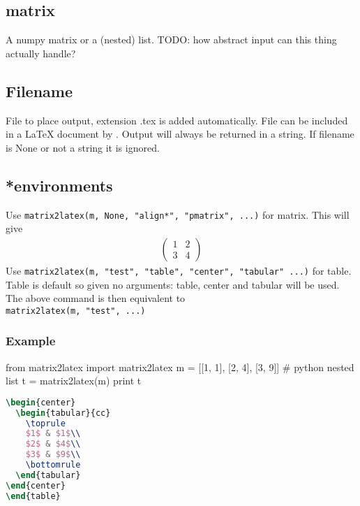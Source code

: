 \subsection{matrix}
  A numpy matrix or a (nested) list. TODO: how abstract input can this thing actually handle?

\subsection{Filename}
  File to place output, extension .tex is added automatically. File can be included in a LaTeX
  document by \verb!!. Output will always be returned in a string. If filename is None
  or not a string it is ignored.
  
\subsection{*environments}
  Use 
\lstinline{matrix2latex(m, None, "align*", "pmatrix", ...)} for matrix.
  This will give
  \begin{align*}
    \begin{pmatrix}
      1 & 2 \\
      3 & 4
    \end{pmatrix}
  \end{align*}
  Use 
\lstinline{matrix2latex(m, "test", "table", "center", "tabular" ...)} for table.
  Table is default so given no arguments: table, center and tabular will be used.
  The above command is then equivalent to \\
\lstinline{matrix2latex(m, "test", ...)}

\subsubsection{Example}
\begin{sageblock}
  from matrix2latex import matrix2latex
  m = [[1, 1], [2, 4], [3, 9]] # python nested list
  t = matrix2latex(m)
  print t
\end{sageblock}
\begin{lstlisting}[language=tex, morekeywords={begin}]
\begin{center}
  \begin{tabular}{cc}
    \toprule
    $1$ & $1$\\
    $2$ & $4$\\
    $3$ & $9$\\
    \bottomrule
  \end{tabular}
\end{center}
\end{table}
\end{lstlisting}

